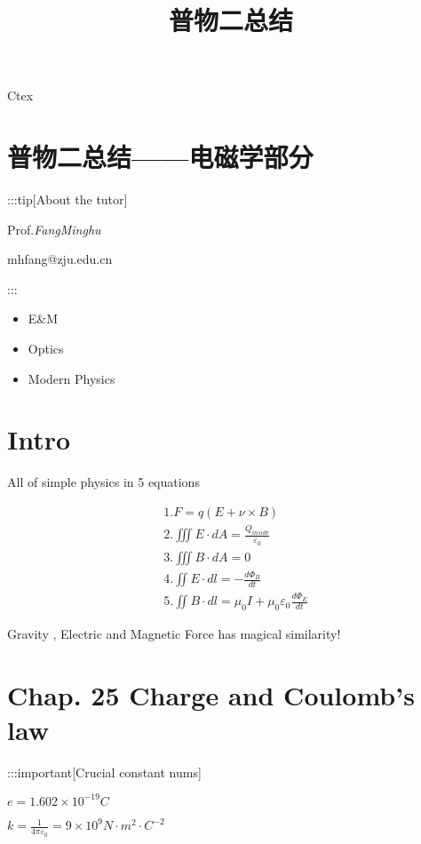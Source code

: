 \documentclass[
]{article}
\title{普物二总结}
\author{}
\date{}
\providecommand{\tightlist}{%
  \setlength{\itemsep}{0pt}\setlength{\parskip}{0pt}}
\begin{document}
\maketitle
Ctex
\hypertarget{ux666eux7269ux4e8cux603bux7ed3ux7535ux78c1ux5b66ux90e8ux5206}{%
\section{普物二总结------电磁学部分}\label{ux666eux7269ux4e8cux603bux7ed3ux7535ux78c1ux5b66ux90e8ux5206}}

:::tip{[}About the tutor{]}

Prof.\emph{FangMinghu}

mhfang@zju.edu.cn

:::

\begin{itemize}
\tightlist
\item
  E\&M
\item
  Optics
\item
  Modern Physics
\end{itemize}

\hypertarget{intro}{%
\section{Intro}\label{intro}}

All of simple physics in 5 equations

\[
\begin{aligned}&1. F=q(E+\nu\times B)\\&2.\iiint E\cdot dA=\frac{Q_{inside}}{\varepsilon_0}\\&3.\iiint B\cdot dA=0\\&4. \iint E\cdot dl=-\frac{d\Phi_B}{dt}\\&5. \iint B\cdot dl =\mu_0I+\mu_0\varepsilon_0 \frac{d\Phi_E}{dt}\end{aligned}
\]

Gravity , Electric and Magnetic Force has magical similarity!

\hypertarget{chap.-25-charge-and-coulombs-law}{%
\section{Chap. 25 Charge and Coulomb's
law}\label{chap.-25-charge-and-coulombs-law}}

:::important{[}Crucial constant nums{]}

\(e=1.602\times 10^{-19}C\)

\(k=\frac{1}{4\pi \varepsilon _0}=9\times 10^{9}N\cdot m^2\cdot C^{-2}\)
\end{document}
